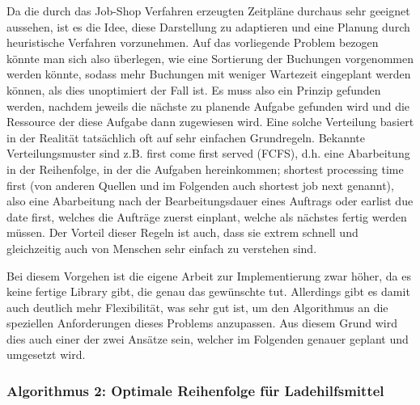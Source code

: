 Da die durch das Job-Shop Verfahren erzeugten Zeitpläne durchaus sehr geeignet aussehen, ist es die Idee, diese Darstellung zu adaptieren und eine Planung durch heuristische Verfahren vorzunehmen. Auf das vorliegende Problem bezogen könnte man sich also überlegen, wie eine Sortierung der Buchungen vorgenommen werden könnte, sodass mehr Buchungen mit weniger Wartezeit eingeplant werden können, als dies unoptimiert der Fall ist. Es muss also ein Prinzip gefunden werden, nachdem jeweils die nächste zu planende Aufgabe gefunden wird und die Ressource der diese Aufgabe dann zugewiesen wird. Eine solche Verteilung basiert in der Realität tatsächlich oft auf sehr einfachen Grundregeln. Bekannte Verteilungsmuster sind z.B. \glqq{}first come first served\grqq{} (FCFS), d.h. eine Abarbeitung in der Reihenfolge, in der die Aufgaben hereinkommen; \glqq{}shortest processing time first\grqq{} (von anderen Quellen und im Folgenden auch \glqq{}shortest job next\grqq{} genannt), also eine Abarbeitung nach der Bearbeitungsdauer eines Auftrags oder \glqq{}earlist due date first\grqq{}, welches die Aufträge zuerst einplant, welche als nächstes fertig werden müssen. Der Vorteil dieser Regeln ist auch, dass sie extrem schnell und gleichzeitig auch von Menschen sehr einfach zu verstehen sind.  \cite{schedulingHeuristics}

Bei diesem Vorgehen ist die eigene Arbeit zur Implementierung zwar höher, da es keine fertige Library gibt, die genau das gewünschte tut. Allerdings gibt es damit auch deutlich mehr Flexibilität, was sehr gut ist, um den Algorithmus an die speziellen Anforderungen dieses Problems anzupassen. Aus diesem Grund wird dies auch einer der zwei Ansätze sein, welcher im Folgenden genauer geplant und umgesetzt wird.


\subsubsection{Algorithmus 2: Optimale Reihenfolge für Ladehilfsmittel}

